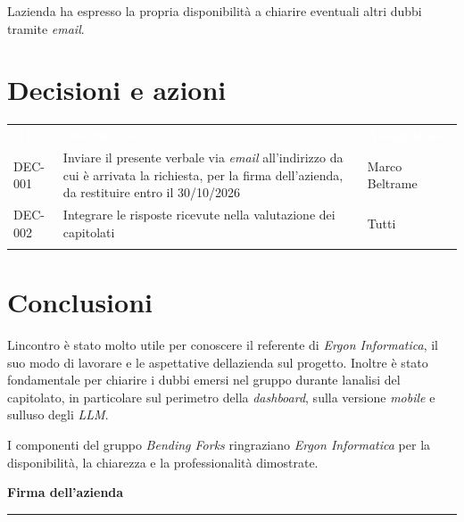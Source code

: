 \documentclass[12pt,a4paper]{article}
\begin{document}
L\textquotesingle azienda ha espresso la propria disponibilità a chiarire eventuali altri dubbi tramite \emph{email}.

\hypertarget{decisioni-e-azioni}{%
\section{Decisioni e azioni}}

\begin{center}
\begin{tabularx}{\linewidth}{>{\hsize=0.511\hsize\raggedright\arraybackslash}X>{\hsize=1.675\hsize\raggedright\arraybackslash}X>{\hsize=0.814\hsize\raggedright\arraybackslash}X}
\rowcolor{bfblue}\textcolor{white}{\textbf{ID}} & \textcolor{white}{\textbf{Descrizione}} & \textcolor{white}{\textbf{Assegnatario}} \\
DEC-001 & Inviare il presente verbale via \emph{email} all'indirizzo da cui è arrivata la richiesta, per la firma dell'azienda, da restituire entro il 30/10/2026 & Marco Beltrame \\ \arrayrulecolor{bfline}\hline
DEC-002 & Integrare le risposte ricevute nella valutazione dei capitolati & Tutti \\ \arrayrulecolor{bfline}\hline
\end{tabularx}
\end{center}

\hypertarget{conclusioni}{%
\section{Conclusioni}}

L\textquotesingle incontro è stato molto utile per conoscere il referente di \emph{Ergon Informatica}, il suo modo di lavorare e le aspettative dell\textquotesingle azienda sul progetto. Inoltre è stato fondamentale per chiarire i dubbi emersi nel gruppo durante l\textquotesingle analisi del capitolato, in particolare sul perimetro della \emph{dashboard}, sulla versione \emph{mobile} e sull\textquotesingle uso degli \emph{LLM}.

I componenti del gruppo \emph{Bending Forks} ringraziano \emph{Ergon Informatica} per la disponibilità, la chiarezza e la professionalità dimostrate.

\vspace{30pt}
\begin{flushright}
\textbf{Firma dell'azienda}\\[22pt]
\rule{60mm}{0.5pt}
\end{flushright}
\end{document}
